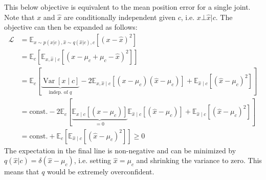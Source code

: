 \documentclass{article} \usepackage{iclr2023_conference,times}
\begin{document}
This below objective is equivalent to the mean position error for a single joint. Note that $x$ and $\hat x$ are conditionally independent given $c$, i.e. $x \bot \hat x\vert c$. The objective can then be expanded as follows:
\begin{align*}
    \mathcal{L} &= \mathbb{E}_{x\sim p(x|c), \hat{x}\sim q(\hat x|c), c}\left[(x - \hat{x})^2\right]\\
    &= \mathbb{E}_{c}\left[\mathbb{E}_{x, \hat{x} \mid c}\left[(x - \mu_c + \mu_c - \hat{x})^2\right]\right]\\
    &= \mathbb{E}_c\left[\underbrace{\operatorname{Var}[x \mid c]}_{\textrm{indep. of } q} - 2\mathbb{E}_{x,\hat{x}\mid c}\left[(x - \mu_c)(\hat{x} - \mu_c)\right] + \mathbb{E}_{\hat{x}\mid c}\left[(\hat{x} - \mu_c)^2\right]\right]\\
    &= \mathrm{const.} - 2\mathbb{E}_c\left[\underbrace{\mathbb{E}_{x\mid c}\left[(x - \mu_c)\right]}_{=0}\mathbb{E}_{\hat{x}\mid c}\left[(\hat{x} - \mu_c)\right] + \mathbb{E}_{\hat{x}\mid c}\left[(\hat{x} - \mu_c)^2\right]\right]\\
    &= \mathrm{const.} + \mathbb{E}_{c}\left[\mathbb{E}_{\hat{x} \mid c}\left[(\hat{x} - \mu_c)^2\right]\right] \ge 0
\end{align*}
The expectation in the final line is non-negative and can be minimized by $q(\hat x|c) = \delta(\hat x - \mu_c)$, i.e. setting $\hat x = \mu_c$ and shrinking the variance to zero. This means that $q$ would be extremely overconfident. 
\end{document}
